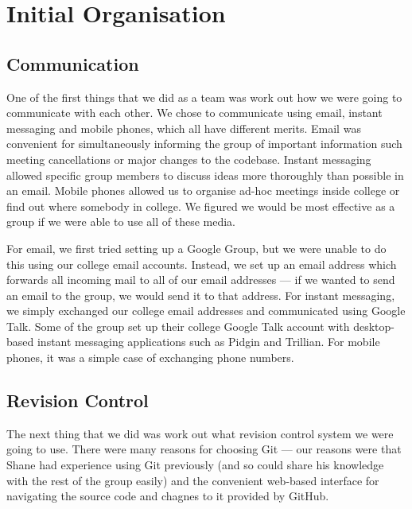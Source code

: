 \section{Initial Organisation}
\subsection{Communication}
One of the first things that we did as a team was work out how we were going to communicate with each other. We chose to communicate using email, instant messaging and mobile phones, which all have different merits. Email was convenient for simultaneously informing the group of important information such meeting cancellations or major changes to the codebase. Instant messaging allowed specific group members to discuss ideas more thoroughly than possible in an email. Mobile phones allowed us to organise ad-hoc meetings inside college or find out where somebody in college. We figured we would be most effective as a group if we were able to use all of these media.

For email, we first tried setting up a Google Group, but we were unable to do this using our college email accounts. Instead, we set up an email address which forwards all incoming mail to all of our email addresses --- if we wanted to send an email to the group, we would send it to that address. For instant messaging, we simply exchanged our college email addresses and communicated using Google Talk. Some of the group set up their college Google Talk account with desktop-based instant messaging applications such as Pidgin and Trillian. For mobile phones, it was a simple case of exchanging phone numbers.

\subsection{Revision Control}
The next thing that we did was work out what revision control system we were going to use. There were many reasons for choosing Git\cite{better} --- our reasons were that Shane had experience using Git previously (and so could share his knowledge with the rest of the group easily) and the convenient web-based interface for navigating the source code and chagnes to it provided by GitHub.
